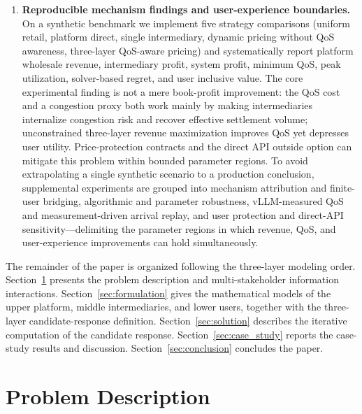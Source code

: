\documentclass[11pt,a4paper]{article}
\begin{document}
\begin{enumerate}[leftmargin=2em]
  \item \textbf{Reproducible mechanism findings and user-experience boundaries.}
  On a synthetic benchmark we implement five strategy comparisons (uniform retail, platform direct, single intermediary, dynamic pricing without QoS awareness, three-layer QoS-aware pricing) and systematically report platform wholesale revenue, intermediary profit, system profit, minimum QoS, peak utilization, solver-based regret, and user inclusive value. The core experimental finding is not a mere book-profit improvement: the QoS cost and a congestion proxy both work mainly by making intermediaries internalize congestion risk and recover effective settlement volume; unconstrained three-layer revenue maximization improves QoS yet depresses user utility. Price-protection contracts and the direct API outside option can mitigate this problem within bounded parameter regions. To avoid extrapolating a single synthetic scenario to a production conclusion, supplemental experiments are grouped into mechanism attribution and finite-user bridging, algorithmic and parameter robustness, vLLM-measured QoS and measurement-driven arrival replay, and user protection and direct-API sensitivity---delimiting the parameter regions in which revenue, QoS, and user-experience improvements can hold simultaneously.
\end{enumerate}

The remainder of the paper is organized following the three-layer modeling order. Section~\ref{sec:problem} presents the problem description and multi-stakeholder information interactions. Section~\ref{sec:formulation} gives the mathematical models of the upper platform, middle intermediaries, and lower users, together with the three-layer candidate-response definition. Section~\ref{sec:solution} describes the iterative computation of the candidate response. Section~\ref{sec:case_study} reports the case-study results and discussion. Section~\ref{sec:conclusion} concludes the paper.

\section{Problem Description}
\label{sec:problem}
\end{document}
